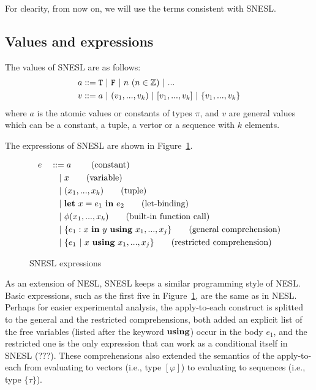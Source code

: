 For clearity, from now on, we will use the terms consistent with SNESL.

\subsection{Values and expressions}

The values of SNESL are as follows:
\begin{align*}
& a ::=  \T \ | \ \F \ | \ n \ (n \in \mathbb{Z}) \ | \ ... \\
& v ::=  a \ | \ (v_1,...,v_k) \ | \ [v_1,...,v_k] \ | \ \{v_1,...,v_k\} 
\end{align*}
where $a$ is the atomic values or constants of types $\pi$, and $v$ are
 general values which can be a constant, a tuple, a vertor or a sequence with $k$ elements.  

The expressions of SNESL are shown in Figure~\ref{fig-snesl-exps}.

\begin{figure}[h]
\begin{alignat*}{2}
& e &&::=  a \     \tag{constant} \\
&   && \quad | \ x  \tag{variable} \\
&   && \quad | \ (x_1,...,x_k) \tag{tuple}\\
&   && \quad | \ \mathbf{let} \ x = e_1 \ \mathbf{in} \ e_2 \tag{let-binding}\\
&   && \quad | \ \phi{(x_1,...,x_k)}  \tag{built-in function call} \\
&   && \quad | \ \{e_1 : x \ \mathbf{in} \ y \ \mathbf{using} \ x_1,...,x_j\} \tag{general comprehension} \\
&   && \quad | \ \{ e_1 \ | \ x \ \mathbf{using} \ x_1,...,x_j \} \tag {restricted comprehension} 
\end{alignat*}
\caption{SNESL expressions \label{fig-snesl-exps}}
\end{figure}

As an extension of NESL, SNESL keeps a similar programming style of NESL. 
Basic expressions, such as the first five in Figure~\ref{fig-snesl-exps}, are the same as in NESL. 
Perhaps for easier experimental analysis,
the apply-to-each construct is splitted to the general and the restricted comprehensions, both added  
an explicit list of the free variables (listed after the keyword $\mathbf{using}$) occur in the body $e_1$,
and the restricted one is the only expression that can work as a conditional itself in SNESL (???). 
These comprehensions also extended the semantics of the apply-to-each from evaluating to vectors (i.e., type $[\varphi]$) to evaluating to sequences (i.e., type $\{\tau\}$). 

